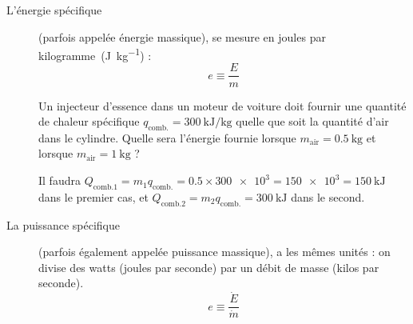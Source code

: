 		\begin{description}
		
			\item[L’énergie spécifique] (parfois appelée énergie massique), se mesure en \si{joules} \si{par} \si{kilogramme}~(\si{\joule\per\kilogram}) :
				\begin{equation}
					e \equiv \frac{E}{m}
				\label{def_énergie_spécifique}
				\end{equation}
		
				\begin{anexample}
					Un injecteur d’essence dans un moteur de voiture doit fournir une quantité de chaleur spécifique $q_{\text{comb.}} = \SI{300}{\kilo\joule\per\kilogram}$ quelle que soit la quantité d’air dans le cylindre. Quelle sera l’énergie fournie lorsque $m_\text{air} = \SI{0,5}{\kilogram}$ et lorsque $m_\text{air} = \SI{1}{\kilogram}$ ?
		
					\begin{answer}Il faudra $Q_{\text{comb.}1} = m_1 q_{\text{comb.}} = \num{0,5} \times \num{300e3} = \num{150e3} = \SI{150}{\kilo\joule}$ dans le premier cas, et $Q_{\text{comb.}2} = m_2 q_{\text{comb.}} = \SI{300}{\kilo\joule}$ dans le second.\end{answer}
					\end{anexample}

		\item[La puissance spécifique] (parfois également appelée puissance massique), a les mê\-mes unités : on divise des \si{watts} (\si{joules} \si{par} \si{seconde}) par un débit de masse (\si{kilos} \si{par} \si{seconde}).
			\begin{equation}
				e \equiv \frac{\dot{E}}{\dot{m}}
				\label{def_puissance_spécifique}
			\end{equation}


\end{description}
